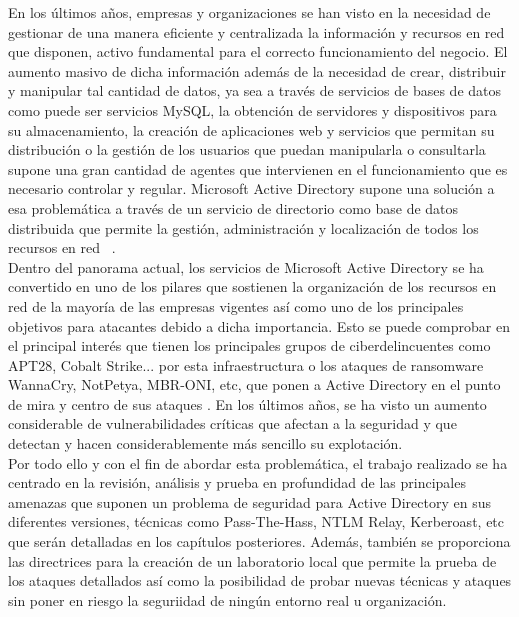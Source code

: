 En los últimos años, empresas y organizaciones se han visto en la necesidad de gestionar de una manera eficiente y centralizada la información y recursos en red que disponen, activo fundamental para el correcto funcionamiento del negocio. El aumento masivo de dicha información además de la necesidad de crear, distribuir y manipular tal cantidad de datos, ya sea a través de servicios de bases de datos como puede ser servicios MySQL, la obtención de servidores y dispositivos para su almacenamiento, la creación de  aplicaciones web y servicios que permitan su distribución o la gestión de los usuarios que puedan manipularla o consultarla supone una gran cantidad de agentes que intervienen en el funcionamiento que es necesario controlar y regular. Microsoft Active Directory supone una solución a esa problemática a través de un servicio de directorio como base de datos distribuida que permite la gestión, administración y localización de todos los recursos en red ~\cite{Capitulo1:Microsoft}.\\

Dentro del panorama actual, los servicios de Microsoft Active Directory se ha convertido en uno de los pilares que sostienen la organización de los recursos en red de la mayoría de las empresas vigentes así como uno de los principales objetivos para atacantes  debido a dicha importancia. Esto se puede comprobar en el principal interés que tienen los principales grupos de ciberdelincuentes como APT28, Cobalt Strike...  por esta infraestructura o los ataques de ransomware WannaCry, NotPetya, MBR-ONI, etc, que ponen a Active Directory en el punto de mira y centro de sus ataques \cite{Capitulo1:Ransomware}. En los últimos años, se ha visto un aumento considerable de vulnerabilidades críticas que afectan a la seguridad y que detectan y hacen considerablemente más sencillo su explotación. \\

Por todo ello y con el fin de abordar esta problemática, el trabajo realizado se ha centrado en la revisión, análisis y prueba en profundidad de las principales amenazas que suponen un problema de seguridad para Active Directory en sus diferentes versiones, técnicas como Pass-The-Hass, NTLM Relay, Kerberoast, etc que serán detalladas en los capítulos posteriores. Además, también se proporciona las directrices para la creación de un laboratorio local que permite la prueba de los ataques detallados así como la posibilidad de probar nuevas técnicas y ataques sin poner en riesgo la seguriidad de ningún entorno real u organización.\\


